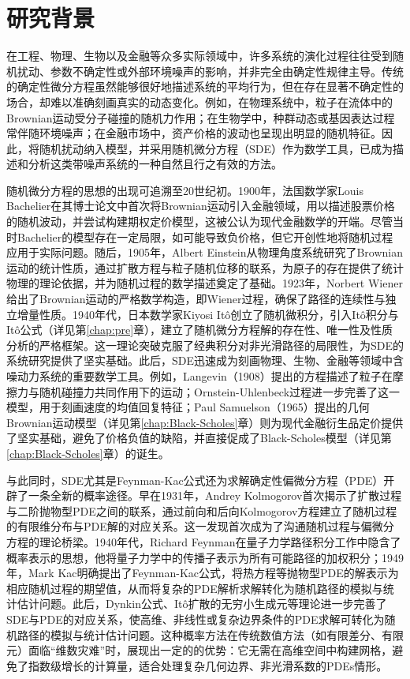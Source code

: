 \documentclass[oneside]{sysuthesis}
\begin{document}
\section{研究背景}

在工程、物理、生物以及金融等众多实际领域中，许多系统的演化过程往往受到随机扰动、参数不确定性或外部环境噪声的影响，并非完全由确定性规律主导。传统的确定性微分方程虽然能够很好地描述系统的平均行为，但在存在显著不确定性的场合，却难以准确刻画真实的动态变化。例如，在物理系统中，粒子在流体中的Brownian运动受分子碰撞的随机力作用；在生物学中，种群动态或基因表达过程常伴随环境噪声；在金融市场中，资产价格的波动也呈现出明显的随机特征。因此，将随机扰动纳入模型，并采用随机微分方程（SDE）作为数学工具，已成为描述和分析这类带噪声系统的一种自然且行之有效的方法。

随机微分方程的思想的出现可追溯至20世纪初。1900年，法国数学家Louis Bachelier在其博士论文中首次将Brownian运动引入金融领域\cite{Bachelier2006}，用以描述股票价格的随机波动，并尝试构建期权定价模型，这被公认为现代金融数学的开端。尽管当时Bachelier的模型存在一定局限，如可能导致负价格，但它开创性地将随机过程应用于实际问题。随后，1905年，Albert Einstein从物理角度系统研究了Brownian运动的统计性质，通过扩散方程与粒子随机位移的联系，为原子的存在提供了统计物理的理论依据，并为随机过程的数学描述奠定了基础\cite{Einstein1905}。1923年，Norbert Wiener给出了Brownian运动的严格数学构造，即Wiener过程，确保了路径的连续性与独立增量性质\cite{Wiener1923}。1940年代，日本数学家Kiyosi Itô创立了随机微积分，引入It\^o积分与It\^o公式（详见第\ref{chap:pre}章），建立了随机微分方程解的存在性、唯一性及性质分析的严格框架\cite{Ito1944}。这一理论突破克服了经典积分对非光滑路径的局限性，为SDE的系统研究提供了坚实基础。此后，SDE迅速成为刻画物理、生物、金融等领域中含噪动力系统的重要数学工具。例如，Langevin（1908）提出的方程描述了粒子在摩擦力与随机碰撞力共同作用下的运动\cite{Langevin1908}；Ornstein-Uhlenbeck过程进一步完善了这一模型，用于刻画速度的均值回复特征\cite{Uhlenbeck1930}；Paul Samuelson（1965）提出的几何Brownian运动模型（详见第\ref{chap:Black-Scholes}章）则为现代金融衍生品定价提供了坚实基础\cite{Samuelson1965}，避免了价格负值的缺陷，并直接促成了Black-Scholes模型（详见第\ref{chap:Black-Scholes}章）的诞生。

与此同时，SDE尤其是Feynman-Kac公式还为求解确定性偏微分方程（PDE）开辟了一条全新的概率途径。早在1931年，Andrey Kolmogorov首次揭示了扩散过程与二阶抛物型PDE之间的联系，通过前向和后向Kolmogorov方程建立了随机过程的有限维分布与PDE解的对应关系\cite{Kolmogorov1931}。这一发现首次成为了沟通随机过程与偏微分方程的理论桥梁。1940年代，Richard Feynman在量子力学路径积分工作中隐含了概率表示的思想，他将量子力学中的传播子表示为所有可能路径的加权积分\cite{Feynman1948}；1949年，Mark Kac明确提出了Feynman-Kac公式\cite{Kac1949}，将热方程等抛物型PDE的解表示为相应随机过程的期望值，从而将复杂的PDE解析求解转化为随机路径的模拟与统计估计问题。此后，Dynkin公式、Itô扩散的无穷小生成元\cite{SDE_book_BO}等理论进一步完善了SDE与PDE的对应关系，使高维、非线性或复杂边界条件的PDE求解可转化为随机路径的模拟与统计估计问题。这种概率方法在传统数值方法（如有限差分、有限元）面临“维数灾难”时，展现出一定的的优势：它无需在高维空间中构建网格，避免了指数级增长的计算量，适合处理复杂几何边界、非光滑系数的PDEs情形。
\end{document}
